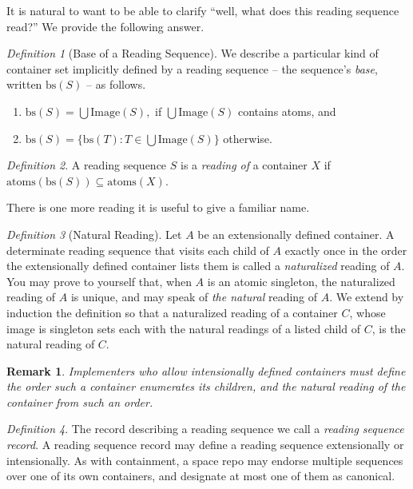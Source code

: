 \documentclass{amsart}
\newtheorem{rem}{Remark}
\theoremstyle{remark}
\newtheorem{defn}{Definition}
\begin{document}
It is natural to want to be able to clarify ``well, what does this reading sequence read?'' We provide the following answer.
\begin{defn}[Base of a Reading Sequence]We describe a particular kind of container set implicitly defined by a reading sequence -- the sequence's \emph{base}, written $\mathrm{bs}(S)$ -- as follows. \begin{enumerate}
\item $\mathrm{bs}(S)=\bigcup\mathrm{Image}(S),$ if $\bigcup\mathrm{Image}(S)$ contains atoms, and
\item $\mathrm{bs}(S)=\{\mathrm{bs}(T) : T \in \bigcup\mathrm{Image}(S)\}$ otherwise.
\end{enumerate}

\end{defn}
\begin{defn}A reading sequence $S$ is a \emph{reading of} a container $X$ if $\mathrm{atoms}(\mathrm{bs}(S))\subseteq \mathrm{atoms}(X).$\end{defn}

There is one more reading it is useful to give a familiar name.
\begin{defn}[Natural Reading]Let $A$ be an extensionally defined container. A determinate reading sequence that visits each child of $A$ exactly once in the order the extensionally defined container lists them is called a \emph{naturalized} reading of $A$. You may prove to yourself that, when $A$ is an atomic singleton, the naturalized reading of $A$ is unique, and may speak of \emph{the natural} reading of $A$. We extend by induction the definition so that a naturalized reading of a container $C$, whose image is singleton sets each with the natural readings of a listed child of $C$, is the natural reading of $C$.\end{defn}

\begin{rem}Implementers who allow intensionally defined containers must define the order such a container enumerates its children, and the natural reading of the container from such an order.\end{rem}

\begin{defn}The record describing a reading sequence we call a \emph{reading sequence record}. A reading sequence record may define a reading sequence extensionally or intensionally. As with containment, a space repo may endorse multiple sequences over one of its own containers, and designate at most one of them as canonical.\end{defn}
\end{document}
